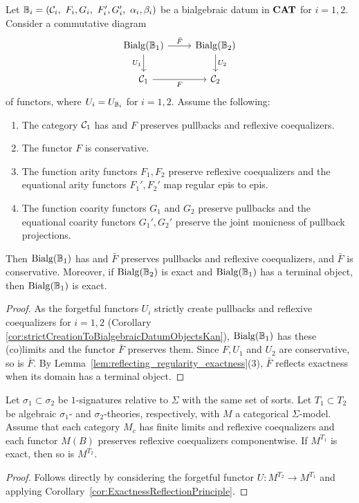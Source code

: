 \begin{corollary}\label{cor:ExactnessReflectionPrinciple}
    Let $\B_i = (\C_i,\ F_i,G_i,\ F_i',G_i',\ \alpha_i,\beta_i)$ be a bialgebraic datum in $\mathbf{CAT}$ for $i = 1,2$. Consider a commutative diagram
    $$
    \begin{tikzcd}
\Bialg(\B_1) \arrow[d, "U_1"'] \arrow[r, "\bar{F}"] & \Bialg(\B_2) \arrow[d, "U_2"] \\
\C_1 \arrow[r, "F"']                                & \C_2                         
\end{tikzcd}
    $$
    of functors, where $U_i = U_{\mathbb{B}_i}$ for $i = 1,2$. Assume the following:
    \begin{enumerate}
        \item The category $\mathcal{C}_1$ has and $F$ preserves pullbacks and reflexive coequalizers.
        \item The functor $F$ is conservative.
        \item The function arity functors $F_1, F_2$ preserve reflexive coequalizers and the equational arity functors $F_1',F_2'$ map regular epis to epis.
        \item The function coarity functors $G_1$ and $G_2$ preserve pullbacks and the equational coarity functors $G_1',G_2'$ preserve the joint monicness of pullback projections.
    \end{enumerate}
    Then $\mathrm{Bialg}(\mathbb{B}_1)$ has and $\bar{F}$ preserves pullbacks and reflexive coequalizers, and $\bar{F}$ is conservative. Moreover, if $\mathrm{Bialg}(\mathbb{B}_2)$ is exact and $\mathrm{Bialg}(\mathbb{B}_1)$ has a terminal object, then $\mathrm{Bialg}(\mathbb{B}_1)$ is exact. 
\end{corollary}
\begin{proof}
    As the forgetful functors $U_i$ strictly create pullbacks and reflexive coequalizers for $i = 1,2$ (Corollary \ref{cor:strictCreationToBialgebraicDatumObjectsKan}), $\mathrm{Bialg}(\mathbb{B}_1)$ has these (co)limits and the functor $\bar{F}$ preserves them. Since $F,U_1$ and $U_2$ are conservative, so is $\bar{F}$. By Lemma~\ref{lem:reflecting_regularity_exactness}(3), $\bar{F}$ reflects exactness when its domain has a terminal object.
\end{proof}
\begin{corollary}\label{cor:exactnessLiftingAlongAlgebraicExtensionsOfTheories}
    Let $\sigma_1\subset\sigma_2$ be $1$-signatures relative to $\Sigma$ with the same set of sorts. Let $T_1\subset T_2$ be algebraic $\sigma_1$- and $\sigma_2$-theories, respectively, with $M$ a categorical $\Sigma$-model. Assume that each category $M_c$ has finite limits and reflexive coequalizers and each functor $M(B)$ preserves reflexive coequalizers componentwise. If $M^{T_1}$ is exact, then so is $M^{T_2}$. 
\end{corollary}
\begin{proof}
    Follows directly by considering the forgetful functor $U\colon M^{T_2}\to M^{T_1}$ and applying Corollary~\ref{cor:ExactnessReflectionPrinciple}. 
\end{proof}

